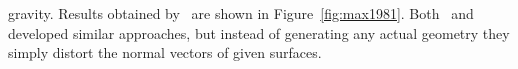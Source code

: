 gravity. Results obtained by~\citeauthor{Max:1981} are shown in
Figure~\ref{fig:max1981}.
%
%
Both~\cite{Schachter:1980} and~\cite{Perlin:1985} developed similar approaches,
but instead of generating any actual geometry they simply distort the normal
vectors of given surfaces.
%
\begin{figure}[t]
 \centering
 \hfill
\end{figure}

